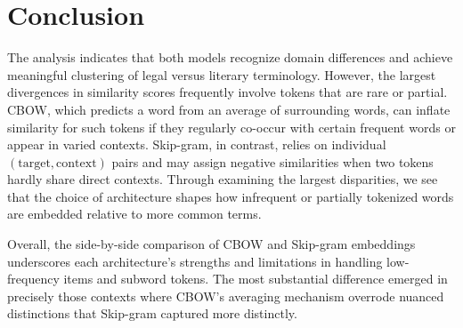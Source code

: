 \documentclass[12pt]{article}
\begin{document}
\section*{Conclusion}
The analysis indicates that both models recognize domain differences and achieve meaningful clustering of legal versus literary terminology. However, the largest divergences in similarity scores frequently involve tokens that are rare or partial. CBOW, which predicts a word from an average of surrounding words, can inflate similarity for such tokens if they regularly co-occur with certain frequent words or appear in varied contexts. Skip-gram, in contrast, relies on individual \((\text{target}, \text{context})\) pairs and may assign negative similarities when two tokens hardly share direct contexts. Through examining the largest disparities, we see that the choice of architecture shapes how infrequent or partially tokenized words are embedded relative to more common terms.

Overall, the side-by-side comparison of CBOW and Skip-gram embeddings underscores each architecture's strengths and limitations in handling low-frequency items and subword tokens. The most substantial difference emerged in precisely those contexts where CBOW's averaging mechanism overrode nuanced distinctions that Skip-gram captured more distinctly.
\end{document}
